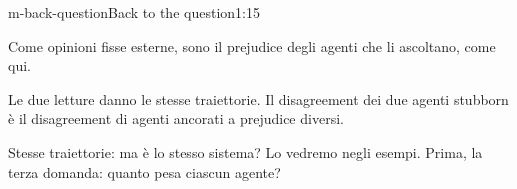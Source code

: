 \begin{slidedue}{m-back-question}{Back to the question\spostata}{1:15 {\color{red}}}
\begin{discorso}
    \item {\color{blue}Come opinioni fisse esterne, sono il prejudice degli agenti che li ascoltano, come qui.}
    \item Le due letture danno le stesse traiettorie. {\color{red}  } {\color{blue}Il disagreement} dei due agenti stubborn è il {\color{red}} {\color{blue}disagreement} di agenti ancorati a {\color{red}} {\color{blue}prejudice} diversi.
    \item {\color{blue}Stesse traiettorie: ma è lo stesso sistema? Lo vedremo negli esempi. Prima, la terza domanda: quanto pesa ciascun agente?}
    \item {\color{red}         }
  \end{discorso}
\end{slidedue}


